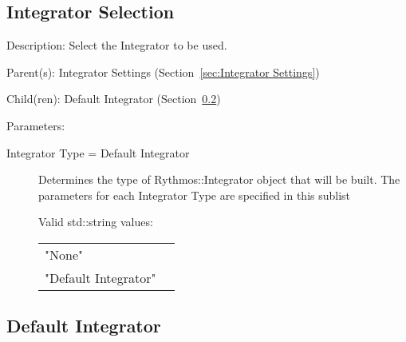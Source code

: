 \subsection{Integrator Selection}
\label{sec:Integrator Selection}

\begin{list}{}
  {\setlength{\leftmargin}{1.0in}
   \setlength{\labelwidth}{0.75in}
   \setlength{\labelsep}{0.125in}}
  \item[Description:]
    Select the Integrator to be used.
  \item[Parent(s):]
    Integrator Settings (Section~\ref{sec:Integrator Settings})
  \item[Child(ren):]
    Default Integrator (Section~\ref{sec:Default Integrator})
  \item[Parameters:]
    \begin{description}
      \item[Integrator Type = Default Integrator] 
Determines the type of Rythmos::Integrator object that will be built.
The parameters for each Integrator Type are specified in this sublist

  Valid std::string values:

      \begin{tabular}{lp{}}
      "None" & \\ 
      "Default Integrator" & \\ 
      \end{tabular}
\end{description}

\end{list}

\subsection{Default Integrator}
\label{sec:Default Integrator}

